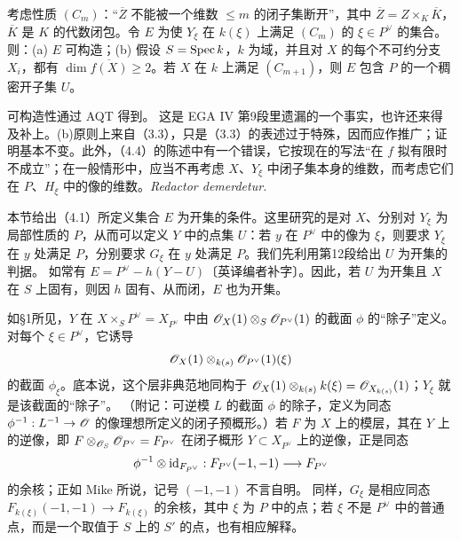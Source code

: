 考虑性质 $(C_m)$：“$\overline Z$ 不能被一个维数 $\leq m$ 的闭子集断开”，其中
$\overline Z=Z\times_K\overline K$，$\overline K$ 是 $K$ 的代数闭包。令 $E$ 为使 $Y_\xi$ 在 $k(\xi)$ 上满足 $(C_m)$ 的 $\xi\in P^\vee$ 的集合。则：(a) $E$ 可构造；(b) 假设 $S=\operatorname{Spec} k$，$k$ 为域，并且对 $X$ 的每个不可约分支 $X_i$，都有 $\dim\overline{f(X)}\geq2$。若 $X$ 在 $k$ 上满足 $(C_{m+1})$，则 $E$ 包含 $P$ 的一个稠密开子集 $U$。

可构造性通过 AQT 得到。
这是 EGA IV 第9段里遗漏的一个事实，也许还来得及补上。(b)原则上来自（3.3），只是（3.3）的表述过于特殊，因而应作推广；证明基本不变。此外，（4.4）的陈述中有一个错误，它按现在的写法“在 $f$ 拟有限时不成立”；在一般情形中，应当不再考虑 $X$、$Y_\xi$ 中闭子集本身的维数，而考虑它们在 $P$、$H_\xi$ 中的像的维数。\textit{Redactor demerdetur.}

本节给出（4.1）所定义集合 $E$ 为开集的条件。这里研究的是对 $X$、分别对 $Y_\xi$ 为局部性质的 $P$，从而可以定义 $Y$ 中的点集 $U$：若 $y$ 在 $P^\vee$ 中的像为 $\xi$，则要求 $Y_\xi$ 在 $y$ 处满足 $P$，分别要求 $G_\xi$ 在 $y$ 处满足 $P$。我们先利用第12段给出 $U$ 为开集的判据。
如常有 $E=P^\vee-h(Y-U)$〔英译编者补字〕。因此，若 $U$ 为开集且 $X$ 在 $S$ 上固有，则因 $h$ 固有、从而闭，$E$ 也为开集。

如§1所见，$Y$ 在 $X\times_SP^\vee=X_{P^\vee}$ 中由
$\mathscr O_X(1)\otimes_S\mathscr O_{P^\vee}(1)$ 的截面 $\phi$ 的“除子”定义。对每个 $\xi\in P^\vee$，它诱导
\[
 \mathscr O_X(1)\otimes_{k(s)}\mathscr O_{P^\vee}(1)(\xi)
\]
的截面 $\phi_\xi$。底本说，这个层非典范地同构于
$\mathscr O_X(1)\otimes_{k(s)}k(\xi)=\mathscr O_{X_{k(s)}}(1)$；$Y_\xi$ 就是该截面的“除子”。
（附记：可逆模 $L$ 的截面 $\phi$ 的除子，定义为同态
$\phi^{-1}:L^{-1}\to\mathscr O$ 的像理想所定义的闭子预概形。）若 $F$ 为 $X$ 上的模层，其在 $Y$ 上的逆像，即 $F\otimes_{\mathscr O_S}\mathscr O_{P^\vee}=F_{P^\vee}$ 在闭子概形 $Y\subset X_{P^\vee}$ 上的逆像，正是同态
\[
 \phi^{-1}\otimes\mathrm{id}_{F_{P^\vee}}:
 F_{P^\vee}(-1,-1)\longrightarrow F_{P^\vee}
\]
的余核；正如 Mike 所说，记号 $(-1,-1)$ 不言自明。
同样，$G_\xi$ 是相应同态 $F_{k(\xi)}(-1,-1)\to F_{k(\xi)}$ 的余核，其中 $\xi$ 为 $P$ 中的点；若 $\xi$ 不是 $P^\vee$ 中的普通点，而是一个取值于 $S$ 上的 $S'$ 的点，也有相应解释。

